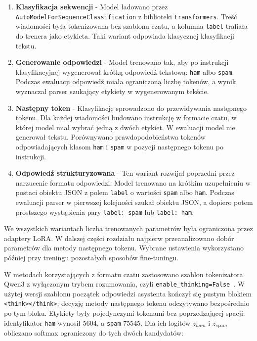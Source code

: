 \begin{enumerate}
  \item \textbf{Klasyfikacja sekwencji} - Model ładowano przez \\\texttt{AutoModelForSequenceClassification} z biblioteki \texttt{transformers}. Treść wiadomości była tokenizowana bez szablonu
czatu, a kolumna \texttt{label} trafiała do trenera jako etykieta. Taki wariant
odpowiada klasycznej klasyfikacji tekstu.
  \item \textbf{Generowanie odpowiedzi} - Model trenowano tak, aby po instrukcji klasyfikacyjnej wygenerował krótką odpowiedź tekstową: \texttt{ham} albo \texttt{spam}. Podczas ewaluacji odpowiedź miała ograniczoną liczbę tokenów, a wynik wyznaczał parser szukający etykiety w wygenerowanym tekście.
  \item  \textbf{Następny token} - Klasyfikację sprowadzono do przewidywania następnego tokenu. Dla każdej wiadomości budowano instrukcję w formacie czatu, w której model miał wybrać jedną z dwóch etykiet. W ewaluacji model nie
generował tekstu. Porównywano prawdopodobieństwa tokenów odpowiadających klasom
\texttt{ham} i \texttt{spam} w pozycji następnego tokenu po instrukcji.
  \item \textbf{Odpowiedź strukturyzowana} - Ten wariant rozwijał poprzedni przez narzucenie formatu odpowiedzi. Model trenowano na krótkim uzupełnieniu w postaci obiektu JSON z polem \texttt{label} o wartości \texttt{spam} albo \texttt{ham}. Podczas ewaluacji parser w pierwszej kolejności szukał obiektu JSON, a dopiero potem prostszego wystąpienia pary \texttt{label: spam} lub \texttt{label: ham}.
\end{enumerate}

We wszystkich wariantach liczba trenowanych parametrów była ograniczona przez
adaptery LoRA. W dalszej części rozdziału najpierw przeanalizowano dobór
parametrów dla metody następnego tokenu. Wybrane ustawienia wykorzystano później
przy treningu pozostałych sposobów fine-tuningu.

W metodach korzystających z formatu czatu zastosowano szablon tokenizatora
Qwen3 z wyłączonym trybem rozumowania, czyli
\texttt{enable\_thinking=False}~\autocite{qwen3-06b-model-card}. W użytej wersji szablonu początek odpowiedzi
asystenta kończył się pustym blokiem \texttt{<think></think>}; decyzję metody
następnego tokenu odczytywano bezpośrednio po tym bloku. Etykiety były
pojedynczymi tokenami bez poprzedzającej spacji: identyfikator \texttt{ham}
wynosił 5604, a \texttt{spam} 75545. Dla ich logitów \(z_{ham}\) i
\(z_{spam}\) obliczano softmax ograniczony do tych dwóch kandydatów:

